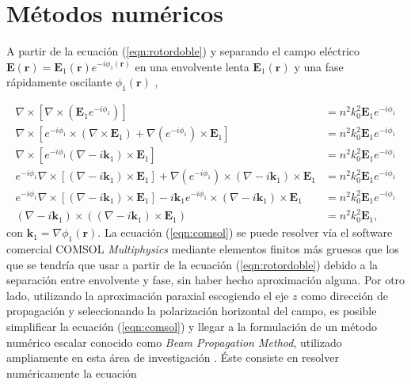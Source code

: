 	


\section{Métodos numéricos}

A partir de la ecuación (\ref{eqn:rotordoble}) y separando el campo eléctrico $\textbf{E}(\textbf{r}) = \textbf{E}_1(\textbf{r}) e^{-i \phi_1 (\textbf{r})}$ en una envolvente lenta $\textbf{E}_1(\textbf{r})$ y una fase rápidamente oscilante $\phi_1 (\textbf{r})$ ,

\begin{align}
\nabla\times[\nabla\times(\textbf{E}_1 e^{-i \phi_1 })] &=  n^2k_0^2 \textbf{E}_1 e^{-i \phi_1}
\\
\nabla\times[ e^{-i \phi_1} \times (\nabla \times \textbf{E}_1) + \nabla(e^{-i \phi_1})\times \textbf{E}_1] &=  n^2k_0^2 \textbf{E}_1 e^{-i \phi_1}
\\
\nabla\times[ e^{-i \phi_1}  (\nabla  - i  \textbf{k} _1)\times\textbf{E}_1  ] &=  n^2k_0^2 \textbf{E}_1 e^{-i \phi_1}
\\
e^{-i \phi_1}  \nabla\times[ (\nabla  - i  \textbf{k} _1)\times\textbf{E}_1] + \nabla(e^{-i \phi_1})\times  (\nabla  - i  \textbf{k} _1)\times\textbf{E}_1  &=  n^2k_0^2 \textbf{E}_1 e^{-i \phi_1}
\\
e^{-i \phi_1}  \nabla\times[ (\nabla  - i  \textbf{k} _1)\times\textbf{E}_1] - i\textbf{k}_1 e^{-i \phi_1}\times  (\nabla  - i  \textbf{k} _1)\times\textbf{E}_1  &=  n^2k_0^2 \textbf{E}_1 e^{-i \phi_1}
\\
	(\nabla-i\textbf{k}_1)\times((\nabla-i\textbf{k}_1)\times \textbf{E}_1) &= n^2k_0^2 \textbf{E}_1,
	 \label{eqn:comsol}
\end{align}
con $\textbf{k}_1 = \nabla\phi_1(\textbf{r})$.
La ecuación (\ref{eqn:comsol}) se puede resolver vía el software comercial COMSOL \textit{Multiphysics} mediante elementos finitos más gruesos que los que se tendría que usar a partir de la ecuación (\ref{eqn:rotordoble}) debido a la separación entre envolvente y fase, sin haber hecho aproximación alguna. Por otro lado, utilizando la aproximación paraxial escogiendo el eje $z$  como dirección de propagación y seleccionando la polarización horizontal del campo, es posible simplificar la ecuación (\ref{eqn:comsol}) y llegar a la formulación de un método numérico escalar conocido como \textit{Beam Propagation Method}, utilizado ampliamente en esta área de investigación \cite{bics, interorbital, OAMCaging, vortex, bpm}. Éste consiste en resolver numéricamente la ecuación
